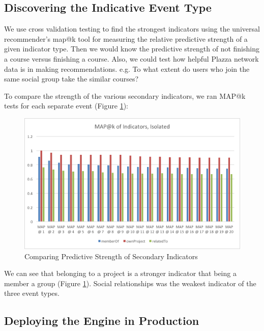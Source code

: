 \documentclass[12pt,journal]{IEEEtran}
\begin{document}
 \cite{ActionMLAdvancedTuning}

\subsection{Discovering the Indicative Event Type}

We use cross validation testing to find the strongest indicators using the universal recommender's map@k tool for measuring the relative predictive strength of a given indicator type.  Then we would know the predictive strength of not finishing a course versus finishing a course.  Also, we could test how helpful Plazza network data is in making recommendations.  e.g. To what extent do users who join the same social group take the similar courses? \cite{ActionMLAdvancedTuning}

To compare the strength of the various secondary indicators, we ran MAP@k tests for each separate event (Figure \ref{fig:MAP_separate_indicators}):

\begin{figure}[htbp]
\begin{center}
\includegraphics[width=1\columnwidth]{MAP_separate_indicators}
\end{center}
\caption{Comparing Predictive Strength of Secondary Indicators}
\label{fig:MAP_separate_indicators}
\end{figure}

We can see that belonging to a project is a stronger indicator that being a member a group (Figure \ref{fig:MAP_separate_indicators}).  Social relationships was the weakest indicator of the three event types.

\subsection{Deploying the Engine in Production}
\end{document}
